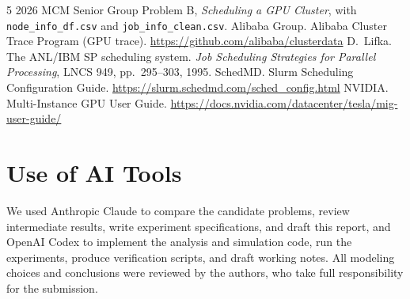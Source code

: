 \documentclass[11pt,a4paper]{article}
\begin{document}
\begin{thebibliography}{5}\small
\setlength{\itemsep}{0pt}
 2026 MCM Senior Group Problem B, \emph{Scheduling a GPU Cluster}, with \texttt{node\_info\_df.csv} and \texttt{job\_info\_clean.csv}.
 Alibaba Group. Alibaba Cluster Trace Program (GPU trace). \url{https://github.com/alibaba/clusterdata}
 D.~Lifka. The ANL/IBM SP scheduling system. \emph{Job Scheduling Strategies for Parallel Processing}, LNCS 949, pp.~295--303, 1995.
 SchedMD. Slurm Scheduling Configuration Guide. \url{https://slurm.schedmd.com/sched_config.html}
 NVIDIA. Multi-Instance GPU User Guide. \url{https://docs.nvidia.com/datacenter/tesla/mig-user-guide/}
\end{thebibliography}

\section*{Use of AI Tools}

We used Anthropic Claude to compare the candidate problems, review intermediate results, write experiment specifications, and draft this report, and OpenAI Codex to implement the analysis and simulation code, run the experiments, produce verification scripts, and draft working notes. All modeling choices and conclusions were reviewed by the authors, who take full responsibility for the submission.
\end{document}
